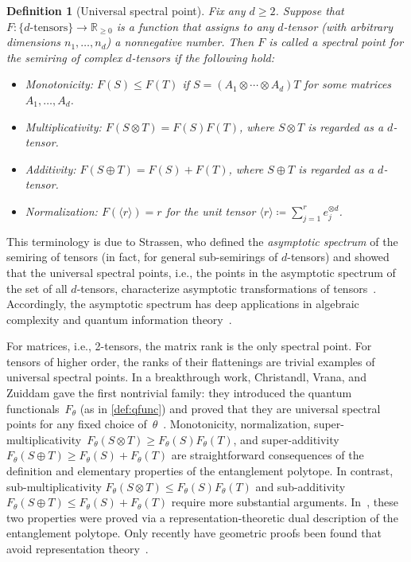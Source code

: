 \documentclass[11pt,letterpaper]{article}
\newtheorem{definition}[theorem]{Definition}\AddToHook{env/definition/begin}{\crefalias{theorem}{definition}}
\numberwithin{equation}{section}
\newcommand{\ot}{\otimes}
\newcommand{\op}{\oplus}
\newcommand{\RR}{\mathbb{R}}
\newcommand{\qfunc}{F}
\begin{document}
\begin{definition}[Universal spectral point]
Fix any $d\geq2$.
Suppose that $\qfunc \colon \{ \text{$d$-tensors} \} \to \RR_{\geq0}$ is a function that assigns to any $d$-tensor (with arbitrary dimensions $n_1,\dots,n_d$) a nonnegative number.
Then $\qfunc$ is called a \emph{spectral point} for the semiring of complex $d$-tensors if the following hold:
\begin{itemize}
\item \emph{Monotonicity:} $\qfunc(S) \le \qfunc(T)$ if $S = (A_1\otimes\cdots\otimes A_d)T$ for some matrices $A_1, \ldots, A_d$.
\item \emph{Multiplicativity:} $\qfunc(S\otimes T) = \qfunc(S)\qfunc(T)$, where $S \ot T$ is regarded as a $d$-tensor.
\item \emph{Additivity:} $\qfunc(S\oplus T) = \qfunc(S)+\qfunc(T)$, where $S \op T$ is regarded as a $d$-tensor.
\item \emph{Normalization:} $\qfunc(\langle r\rangle) = r$ for the unit tensor $\langle r\rangle \coloneqq \sum_{j=1}^r e_j^{\ot d}$.
\end{itemize}
\end{definition}

\noindent This terminology is due to Strassen, who defined the \emph{asymptotic spectrum} of the semiring of tensors (in fact, for general sub-semirings of $d$-tensors) and showed that the universal spectral points, i.e., the points in the asymptotic spectrum of the set of all $d$-tensors, characterize asymptotic transformations of tensors~\cite{Strassen-88}.
Accordingly, the asymptotic spectrum has deep applications in algebraic complexity and quantum information theory~\cite{zuiddam2018algebraic}.

For matrices, i.e., 2-tensors, the matrix rank is the only spectral point.
For tensors of higher order, the ranks of their flattenings are trivial examples of universal spectral points.
In a breakthrough work, Christandl, Vrana, and Zuiddam gave the first nontrivial family: they introduced the quantum functionals~$F_\theta$ (as in \cref{def:qfunc}) and proved that they are universal spectral points for any fixed choice of~$\theta$~\cite{CVZ2018}.
Monotonicity, normalization, super-multiplicativity~$\qfunc_\theta(S\otimes T) \geq \qfunc_\theta(S)\qfunc_\theta(T)$, and super-additivity~$\qfunc_\theta(S\oplus T) \ge \qfunc_\theta(S)+\qfunc_\theta(T)$ are straightforward consequences of the definition and elementary properties of the entanglement polytope.
In contrast, sub-multiplicativity $\qfunc_\theta(S\otimes T) \le \qfunc_\theta(S)\qfunc_\theta(T)$ and sub-additivity~$\qfunc_\theta(S\oplus T) \le \qfunc_\theta(S)+\qfunc_\theta(T)$ require more substantial arguments.
In~\cite{CVZ2018}, these two properties were proved via a representation-theoretic dual description of the entanglement polytope.
Only recently have geometric proofs been found that avoid representation theory~\cite{Hirai2025,SDW2026}.
\end{document}
